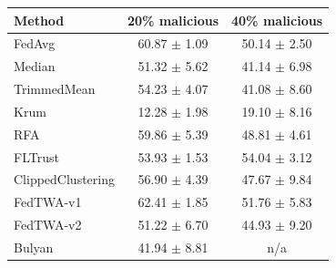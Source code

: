 \begin{tabular}{lcc}
\toprule
Method & 20\% malicious & 40\% malicious \\
\midrule
FedAvg & 60.87 $\pm$ 1.09 & 50.14 $\pm$ 2.50 \\
Median & 51.32 $\pm$ 5.62 & 41.14 $\pm$ 6.98 \\
TrimmedMean & 54.23 $\pm$ 4.07 & 41.08 $\pm$ 8.60 \\
Krum & 12.28 $\pm$ 1.98 & 19.10 $\pm$ 8.16 \\
RFA & 59.86 $\pm$ 5.39 & 48.81 $\pm$ 4.61 \\
FLTrust & 53.93 $\pm$ 1.53 & 54.04 $\pm$ 3.12 \\
ClippedClustering & 56.90 $\pm$ 4.39 & 47.67 $\pm$ 9.84 \\
FedTWA-v1 & 62.41 $\pm$ 1.85 & 51.76 $\pm$ 5.83 \\
FedTWA-v2 & 51.22 $\pm$ 6.70 & 44.93 $\pm$ 9.20 \\
Bulyan & 41.94 $\pm$ 8.81 & n/a \\
\bottomrule
\end{tabular}